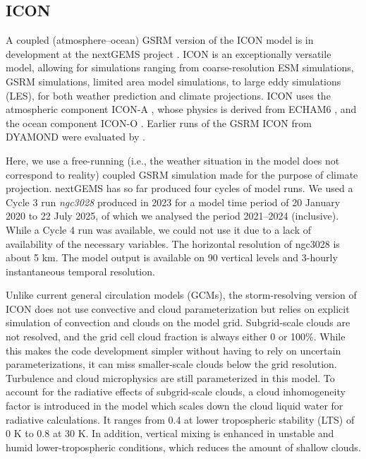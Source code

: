 \documentclass[12pt,a4paper]{article}
\begin{document}
\subsection{ICON}
\label{sec:icon}

A coupled (atmosphere--ocean) GSRM version of the ICON model is in development
at the nextGEMS project \citep{hohenegger2023}. ICON is an exceptionally
versatile model, allowing for simulations ranging from coarse-resolution ESM
simulations, GSRM simulations, limited area model simulations, to large eddy
simulations (LES), for both weather prediction and climate projections. ICON
uses the atmospheric component ICON-A \citep{giorgetta2018}, whose physics is
derived from ECHAM6 \citep{stevens2013}, and the ocean component ICON-O
\citep{korn2022}. Earlier runs of the GSRM ICON from DYAMOND were evaluated by
\cite{mauritsen2022}.

Here, we use a free-running (i.e., the weather situation in the model does not
correspond to reality) coupled GSRM simulation made for the purpose of climate
projection.  nextGEMS has so far produced four cycles of model runs. We used a
Cycle 3 run \emph{ngc3028} produced in 2023 \citep{nextgems2023a,nextgems2023b}
for a model time period of 20 January 2020 to 22 July 2025, of which we
analysed the period 2021--2024 (inclusive). While a Cycle 4 run was available,
we could not use it due to a lack of availability of the necessary variables.
The horizontal resolution of ngc3028 is about 5 km.  The model output is
available on 90 vertical levels and 3-hourly instantaneous temporal resolution.

Unlike current general circulation models (GCMs), the storm-resolving version
of ICON does not use convective and cloud parameterization but relies on
explicit simulation of convection and clouds on the model grid. Subgrid-scale
clouds are not resolved, and the grid cell cloud fraction is always either 0 or
100\%. While this makes the code development simpler without having to rely on
uncertain parameterizations, it can miss smaller-scale clouds below the grid
resolution.  Turbulence and cloud microphysics are still parameterized in this
model. To account for the radiative effects of subgrid-scale clouds, a cloud
inhomogeneity factor is introduced in the model which scales down the cloud
liquid water for radiative calculations. It ranges from 0.4 at lower
tropospheric stability (LTS) of 0 K to 0.8 at 30 K. In addition, vertical
mixing is enhanced in unstable and humid lower-tropospheric conditions, which
reduces the amount of shallow clouds.
\end{document}
